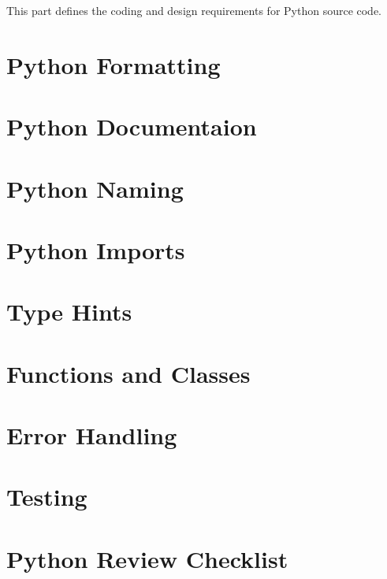 This part defines the coding and design requirements for Python source code.

\section{Python Formatting}


\section{Python Documentaion}


\section{Python Naming}


\section{Python Imports}


\section{Type Hints}


\section{Functions and Classes}


\section{Error Handling}


\section{Testing}


\section{Python Review Checklist}

